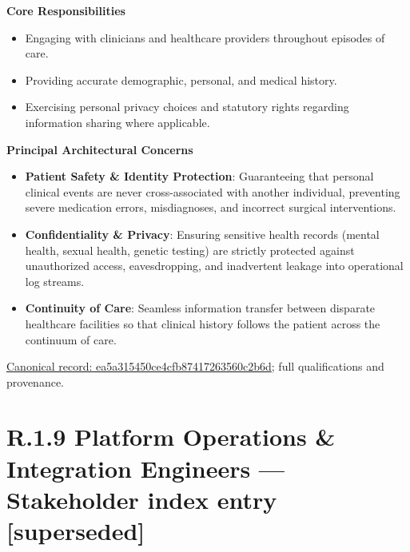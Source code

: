 \par\medskip\textbf{Core Responsibilities}\par


\begin{itemize}


\item Engaging with clinicians and healthcare providers throughout episodes of care.

\item Providing accurate demographic, personal, and medical history.

\item Exercising personal privacy choices and statutory rights regarding information sharing where applicable.

\end{itemize}


\par\medskip\textbf{Principal Architectural Concerns}\par


\begin{itemize}


\item \textbf{Patient Safety \& Identity Protection}: Guaranteeing that personal clinical events are never cross-associated with another individual, preventing severe medication errors, misdiagnoses, and incorrect surgical interventions.

\item \textbf{Confidentiality \& Privacy}: Ensuring sensitive health records (mental health, sexual health, genetic testing) are strictly protected against unauthorized access, eavesdropping, and inadvertent leakage into operational log streams.

\item \textbf{Continuity of Care}: Seamless information transfer between disparate healthcare facilities so that clinical history follows the patient across the continuum of care.

\end{itemize}

{\footnotesize \href{../../../../continuum/motivation/stakeholder/ea5a315450ce4cfb87417263560c2b6d.md}{Canonical record: ea5a315450ce4cfb87417263560c2b6d}; full qualifications and provenance.}\par
\section*{R.1.9 Platform Operations \& Integration Engineers — Stakeholder index entry [superseded]}
\label{navigation:R.1.9}

